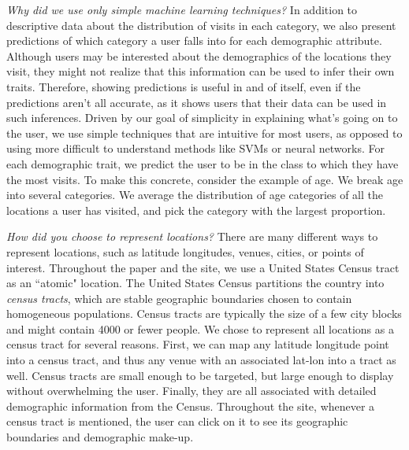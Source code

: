 \emph{Why did we use only simple machine learning techniques?}
In addition to descriptive data about the distribution of visits in each category, we also present predictions of which category a user falls into for each demographic attribute. Although users may be interested about the demographics of the locations they visit, they might not realize that this information can be used to infer their own traits. Therefore, showing predictions is useful in and of itself, even if the predictions aren't all accurate, as it shows users that their data can be used in such inferences.
Driven by our goal of simplicity in explaining what's going on to the user, we use simple techniques that are intuitive for most users, as opposed to using more difficult to understand methods like SVMs or neural networks. For each demographic trait, we predict the user to be in the class to which they have the most visits. To make this concrete, consider the example of age. We break age into several categories. 
We average the distribution of age categories of all the locations a user has visited, and pick the category with the largest proportion. 

\emph{How did you choose to represent locations?}
There are many different ways to represent locations, such as latitude longitudes, venues, cities, or points of interest.
Throughout the paper and the site, we use a United States Census tract as an ``atomic" location.
The United States Census partitions the country into \emph{census tracts}, which are stable geographic boundaries chosen to contain homogeneous populations.
Census tracts are typically the size of a few city blocks and might contain 4000 or fewer people.
We chose to represent all locations as a census tract for several reasons.
First, we can map any latitude longitude point into a census tract, and thus any venue with an associated lat-lon into a tract as well.
Census tracts are small enough to be targeted, but large enough to display without overwhelming the user.
Finally, they are all associated with detailed demographic information from the Census.
Throughout the site, whenever a census tract is mentioned, the user can click on it to see its geographic boundaries and demographic make-up.



